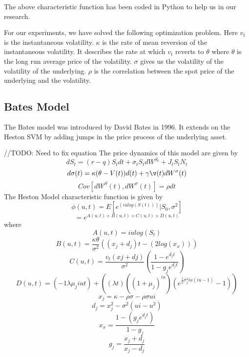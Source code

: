 \documentclass{article}
\begin{document}
The above characteristic function has been coded in Python to help us in our research.

For our experiments, we have solved the following optimization problem. Here $v_t$ is the instantaneous volatility. $\kappa$ is the rate of mean reversion of the instantaneous volatility. It describes the rate at which $v_t$ reverts to $\theta$ where $\theta$ is the long run average price of the volatility. $\sigma$ gives us the volatility of the volatility of the underlying. $\rho$ is the correlation between the spot price of the underlying and the volatility. 
\subsection{Bates Model}
The Bates model was introduced by David Bates in 1996. It extends on the Heston SVM by  adding jumps in the price process of the underlying asset. 


//TODO: Need to fix equation
The price dynamics of this model are given by
\begin{equation}
dS_t = (r- q)S_t dt + \sigma_t S_t dW^{S_t} +J_t S_t N_t
\end{equation}
\begin{equation}
d\sigma(t) = \kappa(\theta-V(t))d(t) + \gamma\v(t)dW^\sigma(t)
\end{equation}
\begin{equation}
Cov[dW^S(t), dW^\sigma(t)] = \rho dt
\end{equation}
The Heston Model characteristic function is given by
\begin{equation}
    \phi(u,t) = E[e^{(iulog(S(t)))}|S_{0}, \sigma^2]
\end{equation}
\begin{equation}
    = e^{A(u,t)+B(u,t)+C(u,t)+D(u,t)}
\end{equation}
where
\begin{equation}
    A(u,t) = iulog(S_t)
\end{equation}
\begin{equation}
    B(u,t) = \frac{\kappa\theta}{\sigma^2}((x_j+d_j)t - (2log(x_x)) )
\end{equation}
\begin{equation}
    C(u,t) = \frac{v_t(xj+dj)}{\sigma^2} (\frac{1-e^{d_j t}}{ 1-g_je^{d_j t}})
\end{equation}
\begin{equation}
    D(u,t) = (-1\lambda \mu_j i u t)+((\lambda t)((1+\mu_j)^{iu})(e^{\frac{1}{2} \sigma_j ^2 iu(iu-1)}-1)) 
\end{equation}
\begin{equation}
    x_j = \kappa-\rho\sigma-\rho\sigma ui
\end{equation}
\begin{equation}
    d_j = x_{j}^2 - \sigma^2(ui - u^2)
\end{equation}
\begin{equation}
    x_x = \frac{ 1-(g_j e^{d_j t})}{ 1-g_j}
\end{equation}
\begin{equation}
    g_j = \frac{x_j + d_j}{x_j - d_j}
\end{equation}
\end{document}
